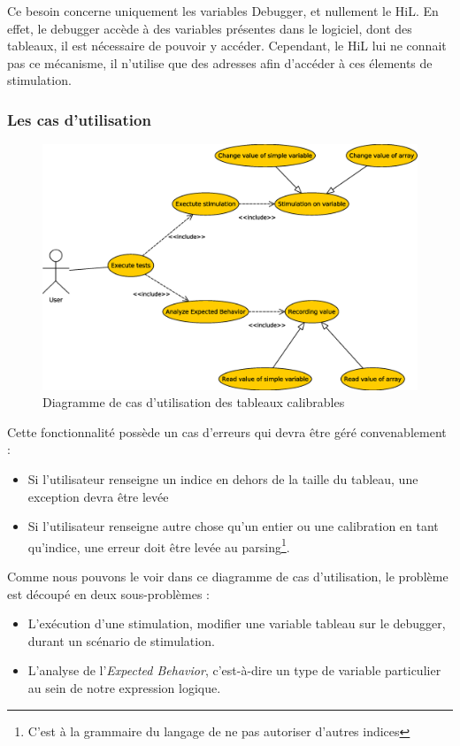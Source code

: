 Ce besoin concerne uniquement les variables Debugger, et nullement le HiL. En effet, le debugger accède à des variables présentes dans le logiciel, dont des tableaux, il est nécessaire de pouvoir y accéder. Cependant, le HiL lui ne connait pas ce mécanisme, il n'utilise que des adresses afin d'accéder à ces élements de stimulation.

\subsubsection{Les cas d'utilisation}
\begin{figure}[H]
\centering
\includegraphics[width=18cm]{contents/images/usecasearray.eps}
\caption{Diagramme de cas d'utilisation des tableaux calibrables}
\end{figure}
\begin{remarque}
Cette fonctionnalité possède un cas d'erreurs qui devra être géré convenablement : 
\begin{itemize}
\item Si l'utilisateur renseigne un indice en dehors de la taille du tableau, une exception devra être levée
\item Si l'utilisateur renseigne autre chose qu'un entier ou une calibration en tant qu'indice, une erreur doit être levée au parsing\footnote{C'est à la grammaire du langage de ne pas autoriser d'autres indices}.
 \end{itemize}
 \end{remarque}
 
 Comme nous pouvons le voir dans ce diagramme de cas d'utilisation, le problème est découpé en deux sous-problèmes : 
 \begin{itemize}
 	\item L'exécution d'une stimulation, modifier une variable tableau sur le debugger, durant un scénario de stimulation. 
 	\item L'analyse de l'\textit{Expected Behavior}, c'est-à-dire un type de variable particulier au sein de notre expression logique.
 \end{itemize}
 

